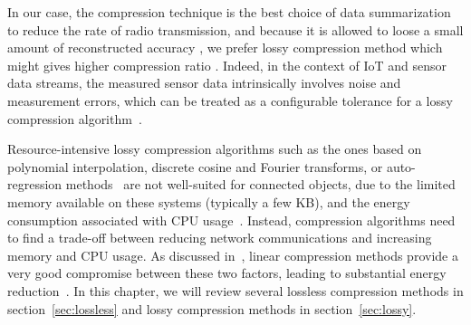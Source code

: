 In our case, the compression technique is the best choice of data summarization
to reduce the rate of radio transmission, and because it is allowed to loose a
small amount of reconstructed accuracy ,
 we prefer lossy compression method which
might gives higher compression ratio . 
Indeed, in the context of IoT and sensor data streams, the
measured sensor data intrinsically involves noise and measurement errors, which
can be treated as a configurable tolerance for a lossy compression
algorithm~\cite{li2018multi}.

Resource-intensive lossy compression algorithms such as the ones based on
polynomial interpolation, discrete cosine and Fourier transforms, or
auto-regression methods~\cite{lu2010optimized} are not well-suited for
connected objects, due to the limited memory available on these systems
(typically a few KB), and the energy consumption associated with CPU
usage~\cite{li2018multi}. Instead, compression algorithms need to find a
trade-off between reducing network communications and increasing memory and CPU
usage. As discussed in~\cite{zordan2014performance}, linear compression methods
provide a very good compromise between these two factors, leading to
substantial energy reduction~\cite{li2018multi}. In this chapter, we will
review several lossless compression methods in section~\ref{sec:lossless} and
lossy compression methods in section~\ref{sec:lossy}.

